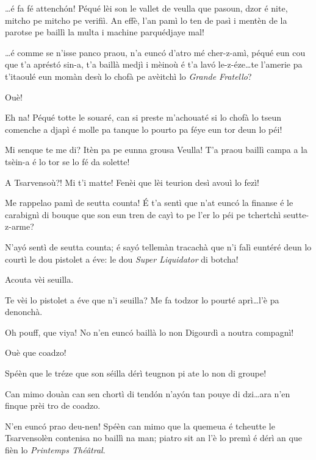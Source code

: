 \begin{drama}
\Pierrespeaks \ldots é fa fé attench\'on! Péqué lèi  son le vallet de veulla que pasoun, dzor é nite, mitcho pe mitcho pe verifiì. An effè, l'an pamì lo ten de pasì i mentèn de la parotse pe baillì la multa i machine parquédjaye mal!

\Laurentspeaks \ldots é comme se n'isse panco praou, n'a eunc\'o d'atro mé cher-z-amì, péqué eun cou que t'a aprést\'o sin-a, t'a baillà medjì i mèinoù é t'a lav\'o le-z-éze\ldots te l'amerie pa t'itaoulé eun momàn desù lo chofà pe avèitchì lo \textit{Grande Fratello}?

\Pierrespeaks Ouè!

\Laurentspeaks Eh na! Péqué totte le souaré, can si preste m'achouaté si lo chofà lo tseun comenche a djapì é molle pa tanque lo pourto pa féye eun tor deun lo péi!

\Pierrespeaks Mi senque te me di? Itèn pa pe eunna grousa Veulla! T'a praou baillì campa a la tsèin-a é lo tor se lo fé da solette!

\Laurentspeaks A Tsarvensoù?! Mi t'i matte! Fenèi que lèi teurion desì avouì lo fezì!

\Pierrespeaks Me rappelao pamì de seutta counta! \'E t'a sentì que n'at eunc\'o la finanse é le carabignì di bouque que son eun tren de cayì to pe l'er lo péi pe tchertchì seutte-z-arme?

\Laurentspeaks N'ay\'o sentì de seutta counta; é say\'o tellemàn tracachà que n'i falì euntéré deun lo courtì le dou pistolet a éve: le dou \textit{Super Liquidator} di botcha!

\Pierrespeaks Acouta vèi seuilla.


\Pierrespeaks {} Te vèi lo pistolet a éve que n'i seuilla?
Me fa todzor lo pourté aprì\ldots l'è pa denonchà.

\Laurentspeaks Oh pouff, que viya! No n'en eunc\'o baillà lo non Digourdì a noutra compagnì!

\Pierrespeaks Ouè que coadzo!

\Laurentspeaks  Spéèn que le tréze que son séilla dérì  teugnon pi ate lo non di groupe!

\Pierrespeaks Can mimo douàn can sen chortì di tend\'on n'ay\'on tan pouye di dzi\ldots ara n'en finque prèi tro de coadzo.

\Laurentspeaks N'en eunc\'o prao deu-nen! Spéèn can mimo que la quemeua é tcheutte le Tsarvensolèn contenisa no baillì na man; piatro sit an l'è lo premì é dérì an que fièn lo \textit{Printemps Thé\^{a}tral}.


\end{drama}
